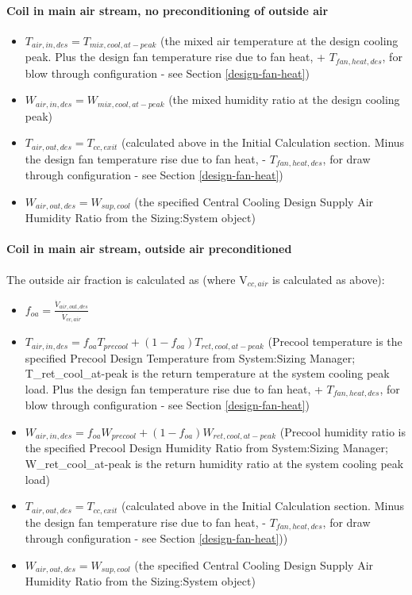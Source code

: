 \paragraph{\textbf{Coil in main air stream, no preconditioning of outside air} }\label{coil-in-main-air-stream-no-preconditioning-of-outside-air}

\begin{itemize}
\item
  \(T_{air,in,des} = T_{mix,cool,at-peak}\) (the mixed air temperature at the design cooling peak. Plus the design fan temperature rise due to fan heat, + \(T_{fan,heat,des}\), for blow through configuration - see Section \ref{design-fan-heat})
\item
  \(W_{air,in,des} = W_{mix,cool,at-peak}\) (the mixed humidity ratio at the design cooling peak)
\item
  \(T_{air,out,des} = T_{cc,exit}\) (calculated above in the Initial Calculation section. Minus the design fan temperature rise due to fan heat, - \(T_{fan,heat,des}\), for draw through configuration - see Section \ref{design-fan-heat})
\item
  \(W_{air,out,des} = W_{sup,cool}\) (the specified Central Cooling Design Supply Air Humidity Ratio from the Sizing:System object)
\end{itemize}

\paragraph{\textbf{Coil in main air stream, outside air preconditioned} }\label{coil-in-main-air-stream-outside-air-preconditioned}

The outside air fraction is calculated as (where V\(_{cc,air}\) is calculated as above):

\begin{itemize}
\item
  \(f_{oa} = \frac{\dot V_{air,out,des}}{\dot{V}_{cc,air}}\)
\item
  \(T_{air,in,des} = f_{oa}T_{precool} + \left(1-f_{oa}\right)T_{ret,cool,at-peak}\) (Precool temperature is the specified Precool Design Temperature from System:Sizing Manager; T\_ret\_cool\_at-peak is the return temperature at the system cooling peak load. Plus the design fan temperature rise due to fan heat, + \(T_{fan,heat,des}\), for blow through configuration - see Section \ref{design-fan-heat})
\item
  \(W_{air,in,des} = f_{oa}W_{precool} + \left(1-f_{oa}\right)W_{ret,cool,at-peak}\) (Precool humidity ratio is the specified Precool Design Humidity Ratio from System:Sizing Manager; W\_ret\_cool\_at-peak is the return humidity ratio at the system cooling peak load)
\item
  \(T_{air,out,des} = T_{cc,exit}\) (calculated above in the Initial Calculation section. Minus the design fan temperature rise due to fan heat, - \(T_{fan,heat,des}\), for draw through configuration - see Section \ref{design-fan-heat}))
\item
  \(W_{air,out,des} = W_{sup,cool}\) (the specified Central Cooling Design Supply Air Humidity Ratio from the Sizing:System object)
\end{itemize}

